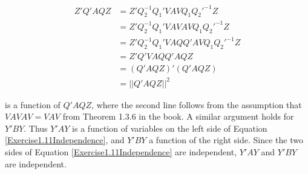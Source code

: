 \documentclass{article}
\begin{document}
\begin{align*}
Z'Q'AQZ &= Z'Q_2^{-1}Q_1'VAVQ_1Q_2'^{-1}Z \\
&= Z'Q_2^{-1}Q_1'VAVAVQ_1Q_2'^{-1}Z \\
&= Z'Q_2^{-1}Q_1'VAQQ'AVQ_1Q_2'^{-1}Z \\
&= Z'Q'VAQQ'AQZ \\
&= (Q'AQZ)'(Q'AQZ) \\
&= ||Q'AQZ||^2
\end{align*}

is a function of $Q'AQZ$, where the second line follows from the assumption that $VAVAV=VAV$ from Theorem 1.3.6 in the book. A similar argument holds for $Y'BY$. Thus $Y'AY$ is a function of variables on the left side of Equation \ref{Exercise1.11Independence}, and $Y'BY$ a function of the right side. Since the two sides of Equation \ref{Exercise1.11Independence} are independent, $Y'AY$ and $Y'BY$ are independent.
\end{document}
